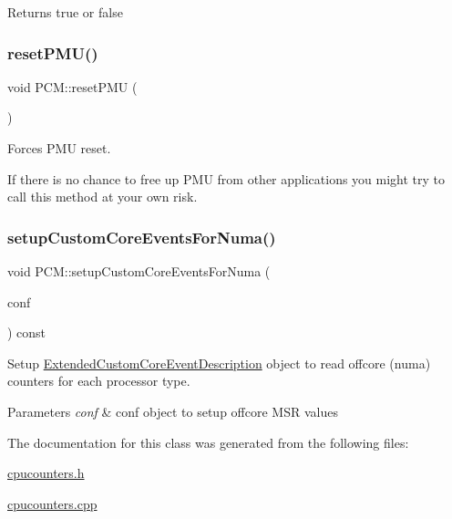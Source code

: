 \begin{DoxyReturn}{Returns}
true or false 
\end{DoxyReturn}
\mbox{\label{class_p_c_m_ad4f5ff2c6ce12f0fb4bb5ae1e5bd157a}} 
\subsubsection{\texorpdfstring{reset\+P\+M\+U()}{resetPMU()}}
{\footnotesize\ttfamily void P\+C\+M\+::reset\+P\+MU (\begin{DoxyParamCaption}{ }\end{DoxyParamCaption})}



Forces P\+MU reset. 

If there is no chance to free up P\+MU from other applications you might try to call this method at your own risk. \mbox{\label{class_p_c_m_aab6624cfd942b9727136dc59a2c7df87}} 
\subsubsection{\texorpdfstring{setup\+Custom\+Core\+Events\+For\+Numa()}{setupCustomCoreEventsForNuma()}}
{\footnotesize\ttfamily void P\+C\+M\+::setup\+Custom\+Core\+Events\+For\+Numa (\begin{DoxyParamCaption}\item[{\mbox{\hyperlink{struct_p_c_m_1_1_extended_custom_core_event_description}{P\+C\+M\+::\+Extended\+Custom\+Core\+Event\+Description}} \&}]{conf }\end{DoxyParamCaption}) const}



Setup \mbox{\hyperlink{struct_p_c_m_1_1_extended_custom_core_event_description}{Extended\+Custom\+Core\+Event\+Description}} object to read offcore (numa) counters for each processor type. 


\begin{DoxyParams}{Parameters}
{\em conf} & conf object to setup offcore M\+SR values \\
\hline
\end{DoxyParams}


The documentation for this class was generated from the following files\+:\begin{DoxyCompactItemize}
\item 
\mbox{\hyperlink{cpucounters_8h}{cpucounters.\+h}}\item 
\mbox{\hyperlink{cpucounters_8cpp}{cpucounters.\+cpp}}\end{DoxyCompactItemize}
